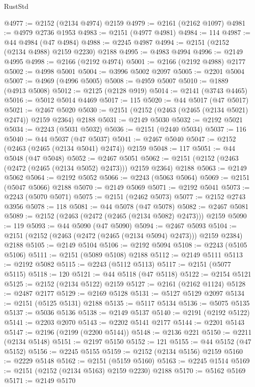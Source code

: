 \begin{lexlean}{RustStd}
\begin{coremodule}
@4977 := @2152 (@2134 @4974) @2159
@4979 := @2161 (@2162 @1097)
@4981 := @4979 @2736 @1953
@4983 := @2151 (@4977 @4981)
@4984 := 114
@4987 := @44 @4984 (@47 @4984)
@4988 := @2245 @4987
@4994 := @2151 (@2152 (@2134 @4988) @2159 @2230) @2188
@4995 := @4983 @4994
@4996 := @2149 @4995
@4998 := @2166 (@2192 @4974)
@5001 := @2166 (@2192 @4988) @2177
@5002 := @4998 @5001
@5004 := @3996 @5002 @2097
@5005 := @2201 @5004
@5007 := @4969 (@4996 @5005)
@5008 := @4959 @5007
@5010 := @1889 (@4913 @5008)
@5012 := @2125 (@2128 @919)
@5014 := @2141 (@3743 @4465)
@5016 := @5012 @5014 @4469
@5017 := 115
@5020 := @44 @5017 (@47 @5017)
@5021 := @2467 @5020
@5030 := @2151 (@2152 (@2463 (@2465 (@2134 @5021) @2474)) @2159 @2364) @2188
@5031 := @2149 @5030
@5032 := @2192 @5021
@5034 := @2243 (@5031 @5032)
@5036 := @2151 (@2440 @5034)
@5037 := 116
@5040 := @44 @5037 (@47 @5037)
@5041 := @2467 @5040
@5047 := @2152 (@2463 (@2465 (@2134 @5041) @2474)) @2159
@5048 := 117
@5051 := @44 @5048 (@47 @5048)
@5052 := @2467 @5051
@5062 := @2151 (@2152 (@2463 (@2472 (@2465 (@2134 @5052) @2473))) @2159 @2364) @2188
@5063 := @2149 @5062
@5064 := @2192 @5052
@5066 := @2243 (@5063 @5064)
@5069 := @2151 (@5047 @5066) @2188
@5070 := @2149 @5069
@5071 := @2192 @5041
@5073 := @2243 (@5070 @5071)
@5075 := @2151 (@2462 @5073)
@5077 := @2152 @2743 @3956
@5078 := 118
@5081 := @44 @5078 (@47 @5078)
@5082 := @2467 @5081
@5089 := @2152 (@2463 (@2472 (@2465 (@2134 @5082) @2473))) @2159
@5090 := 119
@5093 := @44 @5090 (@47 @5090)
@5094 := @2467 @5093
@5104 := @2151 (@2152 (@2463 (@2472 (@2465 (@2134 @5094) @2473))) @2159 @2384) @2188
@5105 := @2149 @5104
@5106 := @2192 @5094
@5108 := @2243 (@5105 @5106)
@5111 := @2151 (@5089 @5108) @2188
@5112 := @2149 @5111
@5113 := @2192 @5082
@5115 := @2243 (@5112 @5113)
@5117 := @2151 (@5077 @5115)
@5118 := 120
@5121 := @44 @5118 (@47 @5118)
@5122 := @2154 @5121
@5125 := @2152 (@2134 @5122) @2159
@5127 := @2161 (@2162 @1124)
@5128 := @2487 @2177
@5129 := @2169 @5128
@5131 := @5127 @5129 @2097
@5134 := @2151 (@5125 @5131) @2188
@5135 := @5117 @5134
@5136 := @5075 @5135
@5137 := @5036 @5136
@5138 := @2149 @5137
@5140 := @2191 (@2192 @5122)
@5141 := @2203 @2070
@5143 := @2202 @5141 @2177
@5144 := @2201 @5143
@5147 := @2196 (@2199 (@2200 @5144))
@5148 := @2136 @221
@5150 := @2211 (@2134 @5148)
@5151 := @2197 @5150
@5152 := 121
@5155 := @44 @5152 (@47 @5152)
@5156 := @2245 @5155
@5159 := @2152 (@2134 @5156) @2159
@5160 := @2229 @5148
@5162 := @2151 (@5159 @5160)
@5163 := @2245 @1514
@5169 := @2151 (@2152 (@2134 @5163) @2159 @2230) @2188
@5170 := @5162 @5169
@5171 := @2149 @5170

\end{coremodule}
\end{lexlean}
